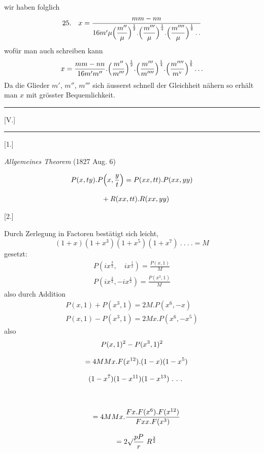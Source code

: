 
wir haben folglich
\[
\begin{gathered}25.\quad x=\frac{mm-nn}{16m'\mu\Bigl(\dfrac{m''}{\mu}\Bigr)^{\frac12}.\Bigl(\dfrac{m'''}{\mu}\Bigr)^{\frac14}.\Bigl(\dfrac{m''''}{\mu}\Bigr)^{\frac18}\mathinner{.\,.}}\end{gathered}
\]
wofür man auch schreiben kann
\[
\begin{gathered}x=\frac{mm-nn}{16m'm''}.\Bigl(\frac{m''}{m'''}\Bigr)^{\frac12}.\Bigl(\frac{m'''}{m''''}\Bigr)^{\frac14}.\Bigl(\frac{m''''}{m^{\mathrm{v}}}\Bigr)^{\frac18}\mathinner{.\,.\,.}\end{gathered}
\]
Da die Glieder $m'$, $m''$, $m'''$ sich äusserst schnell der Gleichheit nähern so erhält man $x$ mit grösster Bequemlichkeit.
\begin{center}\rule{0.25\textwidth}{0.3pt}\end{center}





\clearpage{}


\begin{center}[V.]\par\rule{.10\linewidth}{.3pt}\end{center}

\begin{center}[1.]\par\emph{Allgemeines Theorem} (1827 Aug. 6)\end{center}
\[
\begin{gathered}P(x,ty).P\Bigl(x,\frac yt\Bigr)=P(xx,tt).P(xx,yy)\\[8pt]\quad{}+R(xx,tt).R(xx,yy)\end{gathered}
\]

\par\medskip{}\centerline{[2.]}\nobreak\smallskip
Durch Zerlegung in Factoren bestätigt sich leicht,
\[
(1+x)(1+x^3)(1+x^5)(1+x^7)\ .\ .\ .\ .=M
\]
gesetzt:
\[
\begin{gathered}
P(ix^{\frac32},\quad ix^{\frac12})=\frac{P(x,1)}{M}\\[8pt]
P(ix^{\frac32},-ix^{\frac12})=\frac{P(x^3,1)}{M}
\end{gathered}
\]
also durch Addition
\[
\begin{gathered}
P(x,1)+P(x^3,1)=2M.P(x^6,-x)\\[8pt]
P(x,1)-P(x^3,1)=2Mx.P(x^6,-x^5)
\end{gathered}
\]
also
\[
\begin{gathered}
P(x,1)^2-P(x^3,1)^2
\\[8pt]\quad{}=4MMx.F(x^{12}).(1-x)(1-x^5)\\[8pt]\quad{}(1-x^7)(1-x^{11})(1-x^{13})\ .\ .\ .\\[8pt]
\\[8pt]\quad{}=4MMx.\frac{Fx.F(x^6).F(x^{12})}{Fxx.F(x^3)}
\\[8pt]\quad{}=2\surd\frac{pP}{r}\ R^{\frac32}
\end{gathered}
\]


